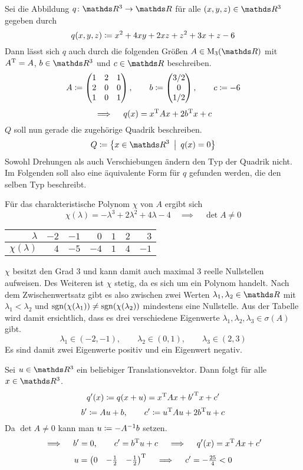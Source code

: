 		Sei die Abbildung $\func{q}{\SR^3}{\SR}$ für alle $(x,y,z)\in\SR^3$ gegeben durch
		\[ q(x,y,z) \coloneqq x^2 + 4xy + 2xz + z^2 + 3x + z - 6 \]
		Dann lässt sich $q$ auch durch die folgenden Größen $A\in\m{M}_3(\SR)$ mit ${A}^{\mathrm{T}}=A$, $b\in\SR^3$ und $c\in\SR$ beschreiben.
		\[
			A\coloneqq
			\begin{pmatrix}
				1 & 2 & 1 \\
				2 & 0 & 0 \\
				1 & 0 & 1
			\end{pmatrix}
			,\qquad b\coloneqq
			\begin{pmatrix}
				3/2 \\ 0 \\ 1/2
			\end{pmatrix}
			,\qquad c\coloneqq -6
		\]
		\[ \implies \quad q(x) = {x}^{\mathrm{T}}Ax + 2{b}^{\mathrm{T}}x + c \]
		$Q$ soll nun gerade die zugehörige Quadrik beschreiben.
		\[ Q\define\set{x\in\SR^3}{q(x)=0} \]
		Sowohl Drehungen als auch Verschiebungen ändern den Typ der Quadrik nicht.
		Im Folgenden soll also eine äquivalente Form für $q$ gefunden werden, die den selben Typ beschreibt.

		Für das charakteristische Polynom $\chi$ von $A$ ergibt sich
		\[ \chi(\lambda) = -\lambda^3 + 2\lambda^2 + 4\lambda - 4 \quad \implies \quad \det A\neq 0 \]
		\begin{table}[H]
			\center
			\begin{tabular}{r||r|r|r|r|r|r}
				$\lambda$ & $-2$ & $-1$ & $0$ & $1$ & $2$ & $3$ \\
				\hline
				$\chi(\lambda)$ & $4$ & $-5$ & $-4$ & $1$ & $4$ & $-1$
			\end{tabular}
		\end{table}
		$\chi$ besitzt den Grad $3$ und kann damit auch maximal $3$ reelle Nullstellen aufweisen.
		Des Weiteren ist $\chi$ stetig, da es sich um ein Polynom handelt.
		Nach dem Zwischenwertsatz gibt es also zwischen zwei Werten $\lambda_1,\lambda_2\in\SR$ mit $\lambda_1<\lambda_2$ und $\operatorname{sgn}(\chi(\lambda_1))\neq\operatorname{sgn}(\chi(\lambda_2))$ mindestens eine Nullstelle.
		Aus der Tabelle wird damit ersichtlich, dass es drei verschiedene Eigenwerte $\lambda_1,\lambda_2,\lambda_3\in\sigma(A)$ gibt.
		\[ \lambda_1 \in (-2,-1),\qquad \lambda_2 \in (0, 1), \qquad \lambda_3 \in (2,3) \]
		Es sind damit zwei Eigenwerte positiv und ein Eigenwert negativ.
		
		Sei $u\in\SR^3$ ein beliebiger Translationsvektor.
		Dann folgt für alle $x\in\SR^3$.
		\[ q^\prime(x) \coloneqq q(x+u) = {x}^{\mathrm{T}}Ax + {b^\prime}^{\mathrm{T}}x + c^\prime \]
		\[ b^\prime \coloneqq Au + b,\qquad c^\prime \coloneqq {u}^{\mathrm{T}}Au + 2{b}^{\mathrm{T}}u + c \]
		Da $\det A \neq 0$ kann man $u\coloneqq -{A}^{-1}b$ setzen.
		\[ \implies \quad b^\prime = 0,\qquad c^\prime = {b}^{\mathrm{T}}u + c \quad \implies \quad q^\prime(x) = {x}^{\mathrm{T}}Ax + c^\prime \]
		\[
			u =
			{
			\begin{pmatrix}
				0 & -\tfrac{1}{2} & -\tfrac{1}{2}
			\end{pmatrix}
			}^{\mathrm{T}} \quad \implies \quad c^\prime = -\tfrac{25}{4} < 0
		\]

